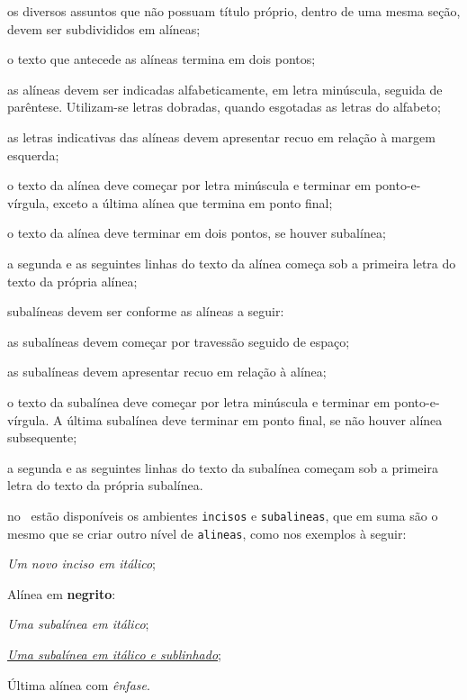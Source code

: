 \begin{alineas}

  \item os diversos assuntos que não possuam título próprio, dentro de uma mesma   seção, devem ser subdivididos em alíneas; 
  \item o texto que antecede as alíneas termina em dois pontos;
  \item as alíneas devem ser indicadas alfabeticamente, em letra minúscula, seguida de parêntese. Utilizam-se letras dobradas, quando esgotadas as letras do alfabeto;
  \item as letras indicativas das alíneas devem apresentar recuo em relação à margem esquerda;
  \item o texto da alínea deve começar por letra minúscula e terminar em ponto-e-vírgula, exceto a última alínea que termina em ponto final;
  \item o texto da alínea deve terminar em dois pontos, se houver subalínea;
  \item a segunda e as seguintes linhas do texto da alínea começa sob a primeira letra do texto da própria alínea;
  \item subalíneas \cite[seção 4.3]{NBR6024:2012} devem ser conforme as alíneas a   seguir:

  \begin{alineas}
     \item as subalíneas devem começar por travessão seguido de espaço;
     \item as subalíneas devem apresentar recuo em relação à alínea;
     \item o texto da subalínea deve começar por letra minúscula e terminar em ponto-e-vírgula. A última subalínea deve terminar em ponto final, se não houver alínea subsequente;
     \item a segunda e as seguintes linhas do texto da subalínea começam sob a primeira letra do texto da própria subalínea.
  \end{alineas}
  
  \item no \abnTeX\ estão disponíveis os ambientes \texttt{incisos} e   \texttt{subalineas}, que em suma são o mesmo que se criar outro nível de \texttt{alineas}, como nos exemplos à seguir:
  
  \begin{incisos}
    \item \textit{Um novo inciso em itálico};
  \end{incisos}
  
  \item Alínea em \textbf{negrito}:
  
  \begin{subalineas}
    \item \textit{Uma subalínea em itálico};
    \item \underline{\textit{Uma subalínea em itálico e sublinhado}}; 
  \end{subalineas}
  
  \item Última alínea com \emph{ênfase}.
  
\end{alineas}


